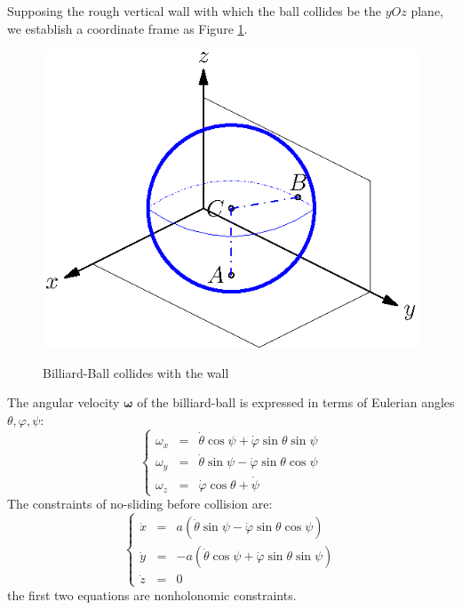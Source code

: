 \documentclass[preprint,12pt]{elsarticle}
\renewcommand{\vec}[1]{\boldsymbol{#1}}
\begin{document}
Supposing the rough vertical wall with which the ball collides be the $yOz$ plane, we establish a coordinate frame as Figure \ref{figure:coordinate}.
\begin{figure}[!hbt]
  \centering
  \includegraphics[scale=1]{myfirst.eps}\\
  \caption{Billiard-Ball collides with the wall}\label{figure:coordinate}
\end{figure}

The angular velocity $\vec{\omega}$ of the billiard-ball is expressed in terms of Eulerian angles $\theta, \varphi, \psi$:
\begin{equation}\label{eq:angular_velocity}
  \left\{\begin{array}{rcl}
  \omega_x&=&\dot{\theta}\cos \psi+\dot{\varphi}\sin \theta \sin \psi\\
  \omega_y&=&\dot{\theta}\sin \psi-\dot{\varphi}\sin \theta \cos \psi\\
  \omega_z&=&\dot{\varphi}\cos \theta+\dot \psi
  \end{array}\right.
\end{equation}
The constraints of no-sliding before collision are:
\begin{equation}\label{eq:Constraints_Ball_NoSliding}
 \left\{\begin{array}{rcl}
 \dot{x} &= &a (\dot{\theta} \sin\psi -\dot{\varphi}\sin\theta \cos\psi)\\
 \dot{y} &=& -a(\dot{\theta} \cos\psi +\dot{\varphi}\sin\theta \sin\psi)\\
 \dot{z} &=& 0
\end{array}\right.
\end{equation}
the first two equations are nonholonomic constraints.
\end{document}
